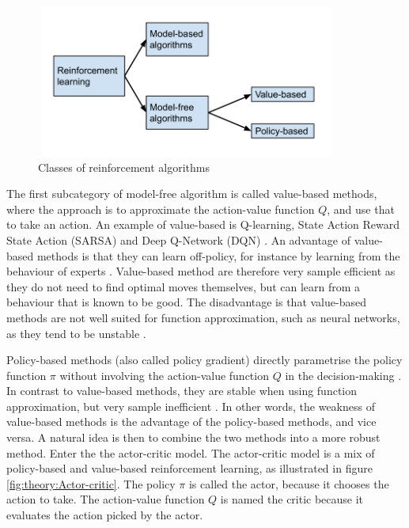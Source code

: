 \documentclass[class=book, crop=false]{standalone}
\begin{document}
\begin{figure}[ht!]
    \center
    \includegraphics[height=5cm, width=10cm]{figures/rl_model_modelfree.png}
    \caption[size = 9]{Classes of reinforcement algorithms}
    \label{fig:theory:rl_model_modelfree}
\end{figure}


The first subcategory of model-free algorithm is called value-based methods, where the approach is to approximate the action-value function $Q$, and use that to take an action. An example of value-based is Q-learning, State Action Reward State Action (SARSA) and Deep Q-Network (DQN) \cite{Sutton1998}. An advantage of value-based methods is that they can learn off-policy, for instance by learning from the behaviour of experts \cite{value_based_policy_Nachum}. Value-based method are therefore very sample efficient as they do not need to find optimal moves themselves, but can learn from a behaviour that is known to be good. The disadvantage is that value-based methods are not well suited for function approximation, such as neural networks, as they tend to be unstable \cite{Sutton1998}. 

Policy-based methods (also called policy gradient) directly parametrise the policy function $\pi$ without involving the action-value function $Q$ in the decision-making \cite{Sutton1998}. In contrast to value-based methods, they are stable when using function approximation, but very sample inefficient \cite{value_based_policy_Nachum}. In other words, the weakness of value-based methods is the advantage of the policy-based methods, and vice versa. A natural idea is then to combine the two methods into a more robust method. Enter the the actor-critic model. The actor-critic model is a mix of policy-based and value-based reinforcement learning, as illustrated in figure \ref{fig:theory:Actor-critic}. The policy $\pi$ is called the actor, because it chooses the action to take. The action-value function $Q$ is named the critic because it evaluates the action picked by the actor.
\end{document}
